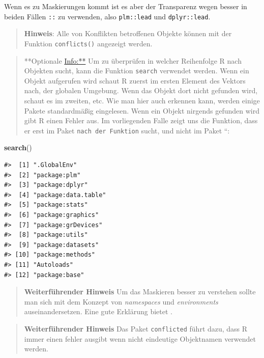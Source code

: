 \documentclass[]{tufte-book}
\newenvironment{Shaded}{}{}
\newcommand{\KeywordTok}[1]{\textcolor[rgb]{0.00,0.44,0.13}{\textbf{#1}}}
\newcommand{\NormalTok}[1]{#1}
\begin{document}
Wenn es zu Maskierungen kommt ist es aber der Transparenz wegen besser
in beiden Fällen \texttt{::} zu verwenden, also \texttt{plm::lead} und
\texttt{dplyr::lead}.

\begin{quote}
\textbf{Hinweis}: Alle von Konflikten betroffenen Objekte können mit der
Funktion \texttt{conflicts()} angezeigt werden.
\end{quote}

\begin{quote}
**Optionale \url{Info:**} Um zu überprüfen in welcher Reihenfolge R nach
Objekten sucht, kann die Funktion \texttt{search} verwendet werden. Wenn
ein Objekt aufgerufen wird schaut R zuerst im ersten Element des Vektors
nach, der globalen Umgebung. Wenn das Objekt dort nicht gefunden wird,
schaut es im zweiten, etc. Wie man hier auch erkennen kann, werden
einige Pakete standardmäßig eingelesen. Wenn ein Objekt nirgends
gefunden wird gibt R einen Fehler aus. Im vorliegenden Falle zeigt uns
die Funktion, dass er erst im Paket \texttt{nach\ der\ Funktion} sucht,
und nicht im Paket ``:
\end{quote}

\begin{Shaded}
\begin{Highlighting}[]
\KeywordTok{search}\NormalTok{()}
\end{Highlighting}
\end{Shaded}

\begin{verbatim}
#>  [1] ".GlobalEnv"        
#>  [2] "package:plm"       
#>  [3] "package:dplyr"     
#>  [4] "package:data.table"
#>  [5] "package:stats"     
#>  [6] "package:graphics"  
#>  [7] "package:grDevices" 
#>  [8] "package:utils"     
#>  [9] "package:datasets"  
#> [10] "package:methods"   
#> [11] "Autoloads"         
#> [12] "package:base"
\end{verbatim}

\begin{quote}
\textbf{Weiterführender Hinweis} Um das Maskieren besser zu verstehen
sollte man sich mit dem Konzept von \emph{namespaces} und
\emph{environments} auseinandersetzen. Eine gute Erklärung bietet
\citet{Packages}.
\end{quote}

\begin{quote}
\textbf{Weiterführender Hinweis} Das Paket \texttt{conflicted} führt
dazu, dass R immer einen fehler ausgibt wenn nicht eindeutige
Objektnamen verwendet werden.
\end{quote}
\end{document}
